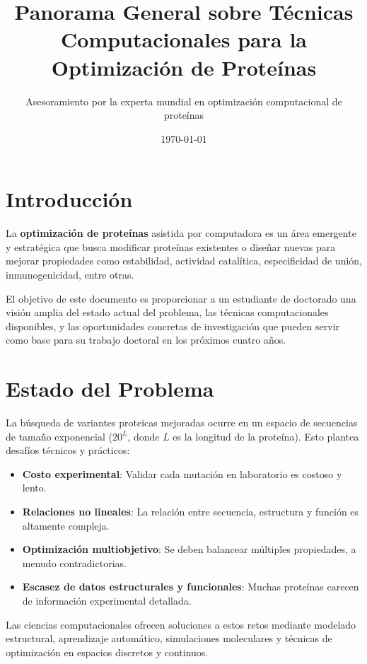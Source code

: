 \documentclass[12pt]{article}
\title{Panorama General sobre Técnicas Computacionales para la Optimización de Proteínas}
\author{Asesoramiento por la experta mundial en optimización computacional de proteínas}
\date{\today}
\begin{document}
\maketitle

\tableofcontents
\newpage

\section{Introducción}

La \textbf{optimización de proteínas} asistida por computadora es un área emergente y estratégica que busca modificar proteínas existentes o diseñar nuevas para mejorar propiedades como estabilidad, actividad catalítica, especificidad de unión, inmunogenicidad, entre otras. 

El objetivo de este documento es proporcionar a un estudiante de doctorado una visión amplia del estado actual del problema, las técnicas computacionales disponibles, y las oportunidades concretas de investigación que pueden servir como base para su trabajo doctoral en los próximos cuatro años.

\section{Estado del Problema}

La búsqueda de variantes proteicas mejoradas ocurre en un espacio de secuencias de tamaño exponencial (\(20^L\), donde \(L\) es la longitud de la proteína). Esto plantea desafíos técnicos y prácticos:

\begin{itemize}
    \item \textbf{Costo experimental}: Validar cada mutación en laboratorio es costoso y lento.
    \item \textbf{Relaciones no lineales}: La relación entre secuencia, estructura y función es altamente compleja.
    \item \textbf{Optimización multiobjetivo}: Se deben balancear múltiples propiedades, a menudo contradictorias.
    \item \textbf{Escasez de datos estructurales y funcionales}: Muchas proteínas carecen de información experimental detallada.
\end{itemize}

Las ciencias computacionales ofrecen soluciones a estos retos mediante modelado estructural, aprendizaje automático, simulaciones moleculares y técnicas de optimización en espacios discretos y continuos.
\end{document}

